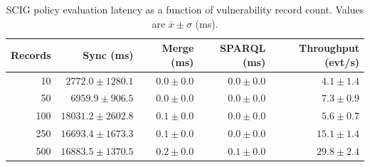 \begin{table}[htbp]
\centering
\caption{SCIG policy evaluation latency as a function of vulnerability record count. Values are $\overline{x} \pm \sigma$ (ms).}
\label{tab:scig_s4_policy}
\begin{tabular}{rrrrr}
\toprule
\textbf{Records} & \textbf{Sync (ms)} & \textbf{Merge (ms)} & \textbf{SPARQL (ms)} & \textbf{Throughput (evt/s)} \\
\midrule
10 & $2772.0 \pm 1280.1$ & $0.0 \pm 0.0$ & $0.0 \pm 0.0$ & $4.1 \pm 1.4$ \\
50 & $6959.9 \pm 906.5$ & $0.0 \pm 0.0$ & $0.0 \pm 0.0$ & $7.3 \pm 0.9$ \\
100 & $18031.2 \pm 2602.8$ & $0.1 \pm 0.0$ & $0.0 \pm 0.0$ & $5.6 \pm 0.7$ \\
250 & $16693.4 \pm 1673.3$ & $0.1 \pm 0.0$ & $0.0 \pm 0.0$ & $15.1 \pm 1.4$ \\
500 & $16883.5 \pm 1370.5$ & $0.2 \pm 0.0$ & $0.1 \pm 0.0$ & $29.8 \pm 2.4$ \\
\bottomrule
\end{tabular}
\end{table}